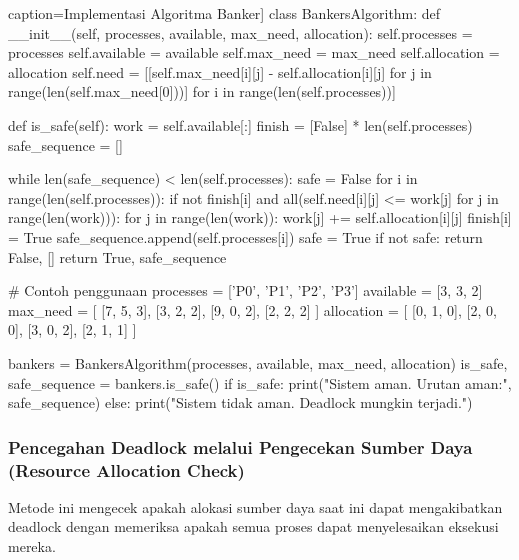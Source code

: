 \documentclass[12pt]{article}
\begin{document}
\begin{python} caption=Implementasi Algoritma Banker]
class BankersAlgorithm:
    def __init__(self, processes, available, max_need, allocation):
        self.processes = processes
        self.available = available
        self.max_need = max_need
        self.allocation = allocation
        self.need = [[self.max_need[i][j] - self.allocation[i][j] for j in range(len(self.max_need[0]))] for i in range(len(self.processes))]

    def is_safe(self):
        work = self.available[:]
        finish = [False] * len(self.processes)
        safe_sequence = []

        while len(safe_sequence) < len(self.processes):
            safe = False
            for i in range(len(self.processes)):
                if not finish[i] and all(self.need[i][j] <= work[j] for j in range(len(work))):
                    for j in range(len(work)):
                        work[j] += self.allocation[i][j]
                    finish[i] = True
                    safe_sequence.append(self.processes[i])
                    safe = True
            if not safe:
                return False, []
        return True, safe_sequence

# Contoh penggunaan
processes = ['P0', 'P1', 'P2', 'P3']
available = [3, 3, 2]
max_need = [
    [7, 5, 3],
    [3, 2, 2],
    [9, 0, 2],
    [2, 2, 2]
]
allocation = [
    [0, 1, 0],
    [2, 0, 0],
    [3, 0, 2],
    [2, 1, 1]
]

bankers = BankersAlgorithm(processes, available, max_need, allocation)
is_safe, safe_sequence = bankers.is_safe()
if is_safe:
    print("Sistem aman. Urutan aman:", safe_sequence)
else:
    print("Sistem tidak aman. Deadlock mungkin terjadi.")
\end{python}

\subsubsection {Pencegahan Deadlock melalui Pengecekan Sumber Daya (Resource Allocation Check)}
Metode ini mengecek apakah alokasi sumber daya saat ini dapat mengakibatkan deadlock dengan memeriksa apakah semua proses dapat menyelesaikan eksekusi mereka.
\end{document}
